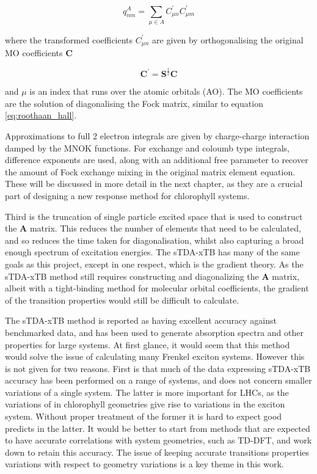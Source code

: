 \begin{equation}
q_{nm}^A = \sum_{\mu \in A} C^\prime_{\mu n} C^\prime_{\mu m}
\end{equation}

where the transformed coefficients $C^\prime_{\mu n}$ are given by orthogonalising
the original MO coefficients $\textbf{C}$

\begin{equation}
\textbf{C}^\prime = \textbf{S}^{\frac{1}{2}} \textbf{C}
\end{equation}

and $\mu$ is an index that runs over the atomic orbitals (AO). The MO coefficients
are the solution of diagonalising the Fock matrix, similar to equation \ref{eq:roothaan_hall}.

Approximations to full 2 electron integrals are given by charge-charge interaction
damped by the MNOK\cite{Nishimoto1957}\cite{Ohno1964}\cite{Klopman1964} functions.
For exchange and coloumb type integrals, difference exponents are used, along with
an additional free parameter to recover the amount of Fock exchange mixing in
the original matrix element equation. These will be discussed in more detail in
the next chapter, as they are a crucial part of designing a new response method 
for chlorophyll systems.

Third is the truncation of single particle excited space that is used to construct 
the $\mathbf{A}$ matrix. This reduces the number of elements that need to be 
calculated, and so reduces the time taken for diagonalisation, whilst also capturing 
a broad enough spectrum of excitation energies. The sTDA-xTB has many of the same 
goals as this project, except in one respect, which is the gradient theory. As 
the sTDA-xTB method still requires constructing and diagonalizing the $\mathbf{A}$ 
matrix, albeit with a tight-binding method for molecular orbital coefficients, 
the gradient of the transition properties would still be difficult to calculate.

The sTDA-xTB method is reported as having excellent accuracy against benchmarked
data, and has been used to generate absorption spectra and other properties for 
large systems. At first glance, it would seem that this method would solve the issue
of calculating many Frenkel exciton systems. However this is not given for two reasons.
First is that much of the data expressing sTDA-xTB accuracy has been performed on
a range of systems, and does not concern smaller variations of a single system. 
The latter is more important for LHCs, as the variations of in chlorophyll geometries
give rise to variations in the exciton system. Without proper treatment of the former
it is hard to expect good predicts in the latter. It would be better to start from
methods that are expected to have accurate correlations with system geometries, 
such as TD-DFT, and work down to retain this accuracy. The issue of keeping accurate
transitions properties variations with respect to geometry variations is a key theme
in this work.

